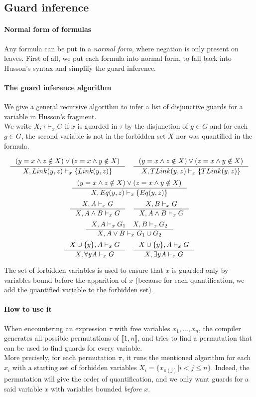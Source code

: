 \documentclass[10pt,a4paper]{article}
\begin{document}
\subsection{Guard inference}
\label{subsec:guardinfer}

\paragraph{Normal form of formulas}
Any formula can be put in a \emph{normal form}, where negation is only present on leaves. First of all, we put each formula into normal form, to fall back into Husson's syntax and simplify the guard inference.

\paragraph{The guard inference algorithm}
We give a general recursive algorithm to infer a list of disjunctive guards for a variable in Husson's fragment.\\
We write $X,\tau \vdash_x G$ if $x$ is guarded in $\tau$ by the disjunction of $g\in G$ and for each $g\in G$, the second variable is not in the forbidden set $X$ nor was quantified in the formula.

\[\inference{(y=x \land z \notin X) \lor (z=x \land y \notin X)}{X, Link(y,z) \vdash_x \{ Link(y,z) \}}  \quad \inference{(y=x \land z \notin X) \lor (z=x \land y \notin X)}{X, TLink(y,z) \vdash_x \{ TLink(y,z)\}}\]
\[\inference{(y=x \land z \notin X) \lor (z=x \land y \notin X)}{X, Eq(y,z) \vdash_x \{ Eq(y,z) \}}\]
\[\inference{X,A \vdash_x G }{X, A\land B \vdash_x G} \quad \inference{X,B \vdash_x G }{X, A\land B \vdash_x G}\]
\[\inference{X,A \vdash_x G_1  \quad X,B \vdash_x G_2}
  {X, A\lor B \vdash_x G_1 \cup G_2}\]
\[\inference{X\cup \{y\},A \vdash_x G }{X, \forall y A \vdash_x G} \quad
\inference{X\cup \{y\},A \vdash_x G }{X, \exists y A \vdash_x G}\]

The set of forbidden variables is used to ensure that $x$ is guarded only by variables bound before the apparition of $x$ (because for each quantification, we add the quantified variable to the forbidden set).

\paragraph{How to use it}
When encountering an expression $\tau$ with free variables $x_1,...,x_n$, the compiler generates all possible permutations of $\llbracket 1,n \rrbracket$, and tries to find a permutation that can be used to find guards for every variable.\\
More precisely, for each permutation $\pi$, it runs the mentioned algorithm for each $x_i$ with a starting set of forbidden variables $X_i = \{x_{\pi(j)} | i<j\le n\}$. Indeed, the permutation will give the order of quantification, and we only want guards for a said variable $x$ with variables bounded \emph{before} $x$.
\end{document}

